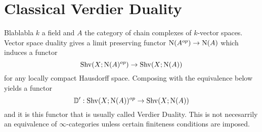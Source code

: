 \documentclass[../../thesis.tex]{subfiles}
\begin{document}
\section{Classical Verdier Duality}
Blablabla $k$ a field and $A$ the category of chain complexes of $k$-vector spaces.
Vector space duality gives a limit preserving functor $\mathrm{N}(A^{op}) \to \mathrm{N}(A)$ which induces a functor
\[
    \mathrm{Shv}(X;\mathrm{N}(A)^{op}) \to \mathrm{Shv}(X;\mathrm{N}(A))
\]
for any locally compact Hausdorff space.
Composing with the equivalence below yields a functor
\[
    \mathbb{D}': \mathrm{Shv}(X;\mathrm{N}(A))^{op} \to \mathrm{Shv}(X;\mathrm{N}(A))
\]
and it is this functor that is usually called Verdier Duality. This is not necesarrily an equivalence of $\infty$-categories unless certain finiteness conditions are imposed.
\end{document}
